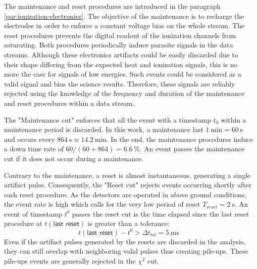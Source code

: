 

The maintenance and reset procedures are introduced in the paragraph \ref{par:ionization-electronics}.  The objective of the maintenance is to recharge the electrodes in order to enforce a constant voltage bias on the whole stream. The reset procedures prevents the digital readout of the ionization channels from saturating. Both procedures periodically induce parasite signals in the data streams. Although these electronics artifacts could be easily discarded due to their shape differing from the expected heat and ionization signals, this is no more the case for signals of low energies. Such events could be considered as a valid signal and bias the science results. Therefore, these signals are reliably rejected using the knowledge of the frequency and duration of the maintenance and reset procedures within a data stream.

The "Maintenance cut" enforces that all the event with a timestamp $t_0$ within a maintenance period is discarded. In this work, a maintenance last $\SI{1}{\minute}=\SI{60}{\s}$ and occurs every $\SI{864}{\s}\approx\SI{14.2}{\minute}$. In the end, the maintenance procedures induce a down time rate of $60/(60+864)=\SI{6.6}{\percent}$. An event passes the maintenance cut if it does not occur during a maintenance.

Contrary to the maintenance, a reset is almost instantaneous, generating a single artifact pulse. Consequently, the "Reset cut" rejects events occurring shortly after each reset procedure. As the detectors are operated in above ground conditions, the event rate is high which calls for the very low period of reset $T_{reset} = \SI{2}{\s}$. An event of timestamp $t^0$ passes the reset cut is the time elapsed since the last reset procedure at $t(\textsf{last reset})$ is greater than a tolerance:
\begin{equation}
t(\textsf{last reset}) - t^0 > \Delta t_{tol}=\SI{5}{\milli\s}
\end{equation}
Even if the artifact pulses generated by the resets are discarded in the analysis, they can still overlap with neighboring valid pulses thus creating pile-ups. These pile-ups events are generally rejected in the $\chi^2$ cut.


